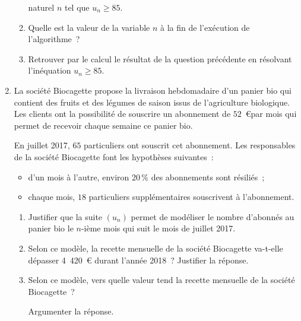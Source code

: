 \begin{enumerate}
\begin{enumerate}[label=\alph*.]
          naturel $n$ tel que $u_n \geqslant 85$.
          \item Quelle est la valeur de la variable $n$ à la fin de l'exécution de l'algorithme~?
          \item Retrouver par le calcul le résultat de la question précédente en résolvant l'inéquation
          $u_n \geqslant 85$.
     \end{enumerate}
     \item  La société Biocagette propose la livraison hebdomadaire d'un panier bio qui contient des fruits
     et des légumes de saison issus de l'agriculture biologique. Les clients ont la possibilité de
     souscrire un abonnement de $52$~\euro par mois qui permet de recevoir chaque semaine ce panier
     bio.
     \par
     En juillet 2017, $65$ particuliers ont souscrit cet abonnement.
     \smallskip
     Les responsables de la société Biocagette font les hypothèses suivantes~:
     \begin{itemize}[label=---]
          \item d'un mois à l'autre, environ 20\,\% des abonnements sont résiliés~;
          \item chaque mois, $18$ particuliers supplémentaires souscrivent à l'abonnement.
     \end{itemize}
     \begin{enumerate}[label=\alph*.]
          \item Justifier que la suite $\left(u_n\right)$ permet de modéliser le nombre d'abonnés au panier bio le $n$-ième mois qui suit le mois de juillet 2017.
          \item Selon ce modèle, la recette mensuelle de la société Biocagette va-t-elle dépasser 4~420~\euro{} durant l'année 2018~? Justifier la réponse.
          \item Selon ce modèle, vers quelle valeur tend la recette mensuelle de la société Biocagette~?
          \par
          Argumenter la réponse.
     \end{enumerate}
\end{enumerate}
